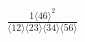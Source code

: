 \documentclass[varwidth, border=5pt]{standalone}
\begin{document}
\begin{my}
$\begin{gathered}
\scriptscriptstyle\frac{1⟨46⟩^2}{⟨12⟩⟨23⟩⟨34⟩⟨56⟩}
\end{gathered}$
\end{my}
\end{document}
